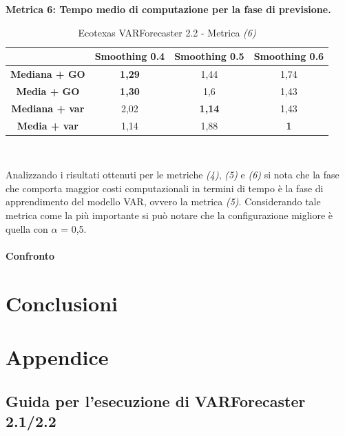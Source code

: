 \documentclass[12pt,a4paper,oneside,openright]{book}
\begin{document}
\medskip 
\textbf{Metrica 6: Tempo medio di computazione per la fase di previsione.}

\medskip

\begin{table}[H]
\centering
\begin{tabular}[H]{|c|c|c|c|}
\hline
& Smoothing 0.4 & Smoothing 0.5 & Smoothing 0.6\\
\hline
\textbf{Mediana + GO} & \textbf{1,29} & 1,44 & 1,74\\ 
\hline
\textbf{Media + GO} & \textbf{1,30} & 1,6 & 1,43\\ 
\hline
\textbf{Mediana + var} & 2,02 & \textbf{1,14} & 1,43\\ 
\hline
\textbf{Media + var} & 1,14 & 1,88 & \textbf{1}\\ 
\hline
\end{tabular} \\
\caption{Ecotexas VARForecaster 2.2 - Metrica \textit{(6)}}
\end{table}

Analizzando i risultati ottenuti per le metriche \textit{(4)}, \textit{(5)} e \textit{(6)} si nota che la fase che comporta maggior costi computazionali in termini di tempo è la fase di apprendimento del modello VAR, ovvero la metrica \textit{(5)}. Considerando tale metrica come la più importante si può notare che la configurazione migliore è quella con $\alpha$ = 0,5.

\newpage
\subsubsection{Confronto}
\chapter{Conclusioni}
\chapter{Appendice}
\section{Guida per l’esecuzione di VARForecaster 2.1/2.2}\
\end{document}
